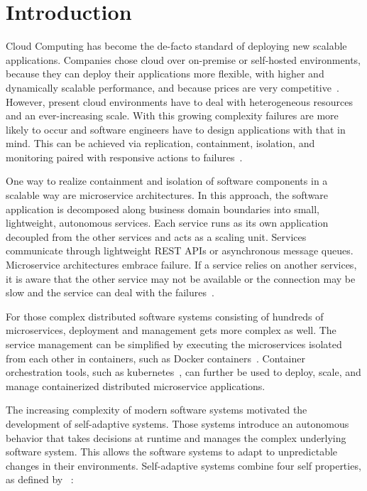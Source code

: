 
\section{Introduction}\label{sec:introduction}
  Cloud Computing has become the de-facto standard of deploying new scalable applications.
  Companies chose cloud over on-premise or self-hosted environments, because they can deploy their applications more flexible, with higher and dynamically scalable performance, and because prices are very competitive~\cite{ToffettiMicroservices}.
  However, present cloud environments have to deal with heterogeneous resources and an ever-increasing scale.
  With this growing complexity failures are more likely to occur and software engineers have to design applications with that in mind.
  This can be achieved via replication, containment, isolation, and monitoring paired with responsive actions to failures~\cite{reactivemanifesto}.

  One way to realize containment and isolation of software components in a scalable way are microservice architectures.
  In this approach, the software application is decomposed along business domain boundaries into small, lightweight, autonomous services.
  Each service runs as its own application decoupled from the other services and acts as a scaling unit.
  Services communicate through lightweight REST APIs or asynchronous message queues.
  Microservice architectures embrace failure.
  If a service relies on another services, it is aware that the other service may not be available or the connection may be slow and the service can deal with the failures~\cite{microservices}.

  For those complex distributed software systems consisting of hundreds of microservices, deployment and management gets more complex as well.
  The service management can be simplified by executing the microservices isolated from each other in containers, such as Docker containers~\cite{docker}.
  Container orchestration tools, such as \gls{kubernetes}~\cite{kubernetes}, can further be used to deploy, scale, and manage containerized distributed microservice applications.

  The increasing complexity of modern software systems motivated the development of self-adaptive systems.
  Those systems introduce an autonomous behavior that takes decisions at runtime and manages the complex underlying software system.
  This allows the software systems to adapt to unpredictable changes in their environments.
  Self-adaptive systems combine four self properties, as defined by \citeauthor{Ganek}~\cite{Ganek}:

